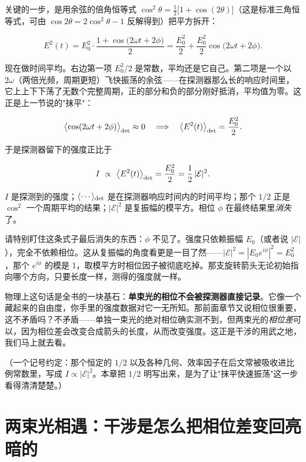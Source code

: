 关键的一步，是用余弦的倍角恒等式 \(\cos^2\theta=\tfrac12\bigl[1+\cos(2\theta)\bigr]\)（这是标准三角恒等式，可由 \(\cos 2\theta=2\cos^2\theta-1\) 反解得到）把平方拆开：

\[
  E^2(t)=E_0^2\cdot\frac{1+\cos\!\bigl(2\omega t+2\phi\bigr)}{2}
  =\frac{E_0^2}{2}+\frac{E_0^2}{2}\cos\!\bigl(2\omega t+2\phi\bigr).
\]

现在做时间平均。右边第一项 \(E_0^2/2\) 是常数，平均还是它自己。第二项是一个以 \(2\omega\)（两倍光频，周期更短）飞快振荡的余弦——在探测器那么长的响应时间里，它上上下下荡了无数个完整周期，正的部分和负的部分刚好抵消，平均值为零。这正是上一节说的"抹平"：

\[
  \bigl\langle\cos(2\omega t+2\phi)\bigr\rangle_{\rm det}\approx 0
  \quad\Longrightarrow\quad
  \bigl\langle E^2(t)\bigr\rangle_{\rm det}=\frac{E_0^2}{2}.
\]

于是探测器留下的强度正比于

\begin{equation}
  I\ \propto\ \bigl\langle E^2(t)\bigr\rangle_{\rm det}=\frac{E_0^2}{2}=\frac{1}{2}\,|\mathcal E|^2 .
  \label{eq:e01-intensity}
\end{equation}
\begin{formulaexplain}
\(I\) 是探测到的强度；\(\langle\cdots\rangle_{\rm det}\) 是在探测器响应时间内的时间平均；那个 \(1/2\) 正是 \(\cos^2\) 一个周期平均的结果；\(|\mathcal E|^2\) 是复振幅的模平方。相位 \(\phi\) 在最终结果里\emph{消失}了。
\end{formulaexplain}

请特别盯住这条式子最后消失的东西：\(\phi\) 不见了。强度只依赖振幅 \(E_0\)（或者说 \(|\mathcal E|\)），完全不依赖相位。这从复振幅的角度看更是一目了然——\(|\mathcal E|^2=|E_0e^{i\phi}|^2=E_0^2\)，那个 \(e^{i\phi}\) 的模是 1，取模平方时相位因子被彻底吃掉。那支旋转箭头无论初始指向哪个方向，只要长度一样，测得的强度就一样。

物理上这句话是全书的一块基石：\textbf{单束光的相位不会被探测器直接记录}。它像一个藏起来的自由度，你手里的强度数据对它一无所知。那前面章节又说相位很重要，这不矛盾吗？不矛盾——单独一束光的绝对相位确实测不到，但两束光的\emph{相位差}可以，因为相位差会改变合成箭头的长度，从而改变强度。这正是干涉的用武之地，我们马上就去看。

（一个记号约定：那个恒定的 \(1/2\) 以及各种几何、效率因子在后文常被吸收进比例常数里，写成 \(I\propto|\mathcal E|^2\)。本章把 \(1/2\) 明写出来，是为了让"抹平快速振荡"这一步看得清清楚楚。）

\section{两束光相遇：干涉是怎么把相位差变回亮暗的}
\label{sec:e01-interference}

